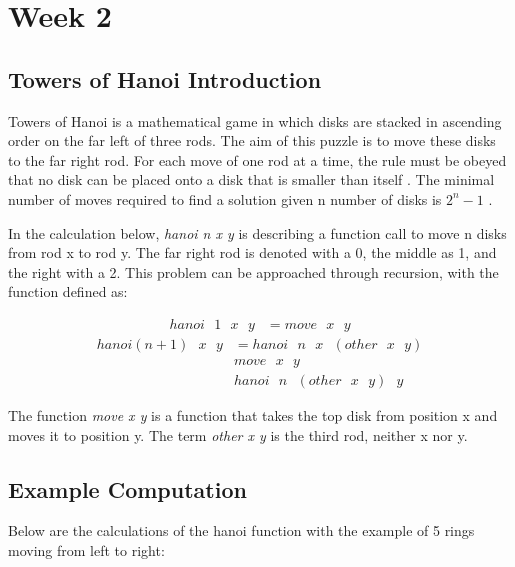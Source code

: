 \documentclass{article}
\theoremstyle{theorem}
\theoremstyle{definition}
\theoremstyle{remark}
\begin{document}
\section{Week 2}

\subsection{Towers of Hanoi Introduction}

Towers of Hanoi is a mathematical game in which disks are stacked in ascending order on the far left of three rods. The aim of this puzzle is to move these disks to the far right rod. For each move of one rod at a time, the rule must be obeyed that no disk can be placed onto a disk that is smaller than itself \cite{Wik}. The minimal number of moves required to find a solution given n number of disks is $2^n - 1$ \cite{Wik}.

In the calculation below, \textit{hanoi n x y} is describing a function call to move n disks from rod x to rod y. The far right rod is denoted with a 0, the middle as 1, and the right with a 2. This problem can be approached through recursion, with the function defined as: 

\begin{align}
hanoi \text{ }1 \text{ }x \text{ }y &=  move \text{ }x \text{ }y
\end{align}
\begin{align}
hanoi (n + 1) \text{ }x \text{ }y &=
hanoi \text{ }n \text{ }x \text{ }(other \text{ }x \text{ }y)\\
& move \text{ }x \text{ }y\\
& hanoi \text{ }n \text{ }(other \text{ }x \text{ }y) \text{ }y
\end{align}

The function \textit{move x y} is a function that takes the top disk from position x and moves it to position y. The term \textit{other x y} is the third rod, neither x nor y.

\subsection{Example Computation}

Below are the calculations of the hanoi function with the example of 5 rings moving from left to right: 
\end{document}
